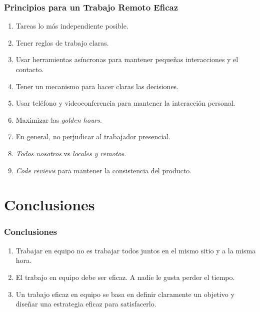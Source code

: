 \documentclass[a4paper,slidestop,xcolor=pst,dvips,blue]{beamer}
\begin{document}
\begin{frame}[c]
	\frametitle{Principios para un Trabajo Remoto Eficaz}
	\begin{enumerate}[<+->]
        \item Tareas lo más independiente posible.
        \item Tener reglas de trabajo claras.
        \item Usar herramientas asíncronas para mantener pequeñas interacciones y el contacto.
        \item Tener un mecanismo para hacer claras las decisiones.
        \item Usar teléfono y videoconferencia para mantener la interacción personal.
        \item Maximizar las \emph{golden hours}.
        \item En general, no perjudicar al trabajador presencial.
        \item \emph{Todos nosotros} vs \emph{locales y remotos}.
        \item \emph{Code reviews} para mantener la consistencia del producto.
	\end{enumerate}
\end{frame}


\section{Conclusiones}

\begin{frame}[c]
	\frametitle{Conclusiones}
	\begin{enumerate}[<+->]
		\item Trabajar en equipo no es trabajar todos juntos en el mismo sitio y a la misma hora.
		\item El trabajo en equipo debe ser eficaz. A nadie le gusta perder el tiempo.
		\item Un trabajo eficaz en equipo se basa en definir claramente un objetivo y diseñar una estrategia eficaz para satisfacerlo.
	\end{enumerate}
\end{frame}
\end{document}

